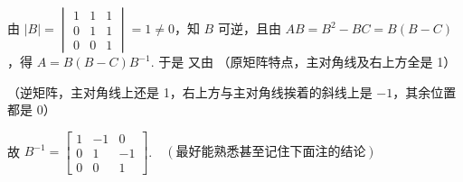 由 $|B|=\begin{vmatrix}1&1&1\\0&1&1\\0&0&1\end{vmatrix}=1\ne0$，知 $B$ 可逆，且由 $AB=B^2-BC=B(B-C)$，得 $A=B(B-C)B^{-1}$. 于是
又由
（原矩阵特点，主对角线及右上方全是 1）

（逆矩阵，主对角线上还是 1，右上方与主对角线挨着的斜线上是 $-1$，其余位置都是 0）


故 $B^{-1}=\begin{bmatrix}1&-1&0\\0&1&-1\\0&0&1\end{bmatrix}$.$\quad(\text{最好能熟悉甚至记住下面注的结论})$

